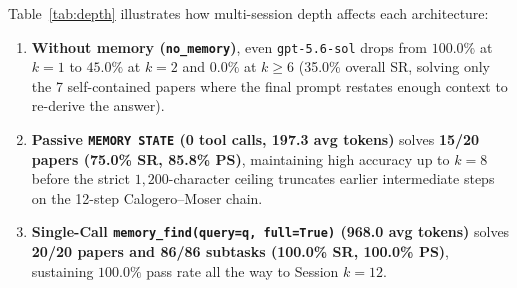 \documentclass[11pt,a4paper]{article}
\begin{document}
\begin{table}[h]
\centering
\caption{Passrate by Session Depth (\texttt{passrate\_at\_k} from official \texttt{eval.py}) across all 20 papers (86 subtasks) on \texttt{gpt-5.6-sol} and \texttt{gpt-5-mini}.}
\label{tab:depth}
\end{table}

Table~\ref{tab:depth} illustrates how multi-session depth affects each architecture:
\begin{enumerate}[leftmargin=1.5em,itemsep=2pt]
    \item \textbf{Without memory (\texttt{no\_memory})}, even \texttt{gpt-5.6-sol} drops from $100.0\%$ at $k=1$ to $45.0\%$ at $k=2$ and $0.0\%$ at $k \ge 6$ (35.0\% overall SR, solving only the 7 self-contained papers where the final prompt restates enough context to re-derive the answer).
    \item \textbf{Passive \texttt{MEMORY STATE} (0 tool calls, 197.3 avg tokens)} solves \textbf{15/20 papers (75.0\% SR, 85.8\% PS)}, maintaining high accuracy up to $k=8$ before the strict $1{,}200$-character ceiling truncates earlier intermediate steps on the 12-step Calogero--Moser chain.
    \item \textbf{Single-Call \texttt{memory\_find(query=q, full=True)} (968.0 avg tokens)} solves \textbf{20/20 papers and 86/86 subtasks (100.0\% SR, 100.0\% PS)}, sustaining $100.0\%$ pass rate all the way to Session $k=12$.
\end{enumerate}
\end{document}
